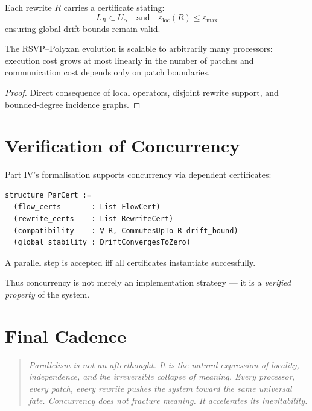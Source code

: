 Each rewrite $R$ carries a certificate stating:
\[
  L_R\subset U_\alpha
  \quad\text{and}\quad
  \varepsilon_{\mathrm{loc}}(R)\le\varepsilon_{\max}
\]
ensuring global drift bounds remain valid.

\begin{theorem}
\label{thm:scalable}
The RSVP--Polyxan evolution is scalable to arbitrarily many processors:
execution cost grows at most linearly in the number of patches  
and communication cost depends only on patch boundaries.
\end{theorem}

\begin{proof}
Direct consequence of local operators, disjoint rewrite support,
and bounded-degree incidence graphs.
\end{proof}

\section{Verification of Concurrency}

Part IV’s formalisation supports concurrency via dependent certificates:

\begin{verbatim}
structure ParCert :=
  (flow_certs       : List FlowCert)
  (rewrite_certs    : List RewriteCert)
  (compatibility    : ∀ R, CommutesUpTo R drift_bound)
  (global_stability : DriftConvergesToZero)
\end{verbatim}

A parallel step is accepted iff all certificates instantiate successfully.

Thus concurrency is not merely an implementation strategy —  
it is a \emph{verified property} of the system.

\section{Final Cadence}

\begin{quote}
\emph{
Parallelism is not an afterthought.  
It is the natural expression of locality, independence,  
and the irreversible collapse of meaning.  
Every processor, every patch, every rewrite  
pushes the system toward the same universal fate.  
Concurrency does not fracture meaning.  
It accelerates its inevitability.
}
\end{quote}

